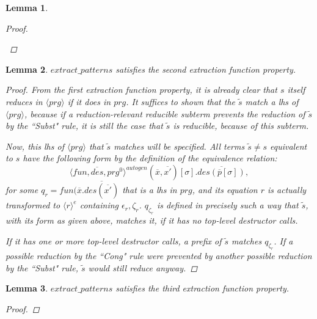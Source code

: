 \documentclass[11pt]{article} %
\newtheorem*{lemma*}{Lemma}
\begin{document}
\begin{framed}
\begin{lemma*}
\begin{proof}
\begin{enumerate}
\end{enumerate}

\end{proof}

\end{lemma*}

\begin{lemma*}

$extract\_patterns$ satisfies the second extraction function property.

\begin{proof}

From the first extraction function property, it is already clear that $s$ itself reduces in $\langle prg \rangle$ if it does in $prg$. It suffices to shown that the $\widetilde{s}$ match a lhs of $\langle prg \rangle$, because if a reduction-relevant reducible subterm prevents the reduction of $\widetilde{s}$ by the ``Subst" rule, it is still the case that $\widetilde{s}$ is reducible, because of this subterm.

Now, this lhs of $\langle prg \rangle$ that $\widetilde{s}$ matches will be specified. All terms $\widetilde{s} \neq s$ equivalent to $s$ have the following form by the definition of the equivalence relation:
\begin{equation*}
\langle fun, \overline{des}, prg^0 \rangle^{autogen}(\overline{x}, \overline{x'})[\sigma].\overline{des(\overline{p}[\sigma])},
\end{equation*}
for some $q_r = fun(\overline{x}.\overline{des(\overline{x'})}$ that is a lhs in $prg$, and its equation $r$ is actually transformed to $\langle r \rangle^e$ containing $\epsilon_r, \zeta_r$. $q_{\zeta_r}$ is defined in precisely such a way that $\widetilde{s}$, with its form as given above, matches it, if it has no top-level destructor calls.

If it has one or more top-level destructor calls, a prefix of $\widetilde{s}$ matches $q_{\zeta_r}$. If a possible reduction by the ``Cong" rule were prevented by another possible reduction by the ``Subst" rule, $\widetilde{s}$ would still reduce anyway.

\end{proof}

\end{lemma*}

\begin{lemma*}

$extract\_patterns$ satisfies the third extraction function property.

\begin{proof}


\end{proof}
\end{lemma*}
\end{framed}
\end{document}
